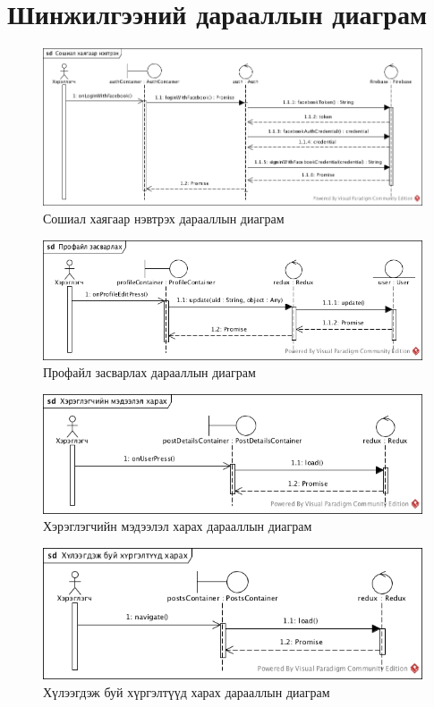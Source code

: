 \section{Шинжилгээний дарааллын диаграм}

\begin{figure}[H]
	\centering
	\includegraphics[width=\textwidth]{Figures/shinjilgee/seq/social_haygaar_nevtreh.jpg}
	\caption{Сошиал хаягаар нэвтрэх дарааллын диаграм}
\end{figure}

\begin{figure}[H]
	\centering
	\includegraphics[width=\textwidth]{Figures/shinjilgee/seq/profile_zasvarlah.jpg}
  \caption{Профайл засварлах дарааллын диаграм}
\end{figure}

\begin{figure}[H]
	\centering
	\includegraphics[width=\textwidth]{Figures/shinjilgee/seq/test.jpg}
  \caption{Хэрэглэгчийн мэдээлэл харах дарааллын диаграм}
\end{figure}

\begin{figure}[H]
	\centering
	\includegraphics[width=\textwidth]{Figures/shinjilgee/seq/huleegdej_bui_hurgelt_harah.jpg}
  \caption{Хүлээгдэж буй хүргэлтүүд харах дарааллын диаграм}
\end{figure}


